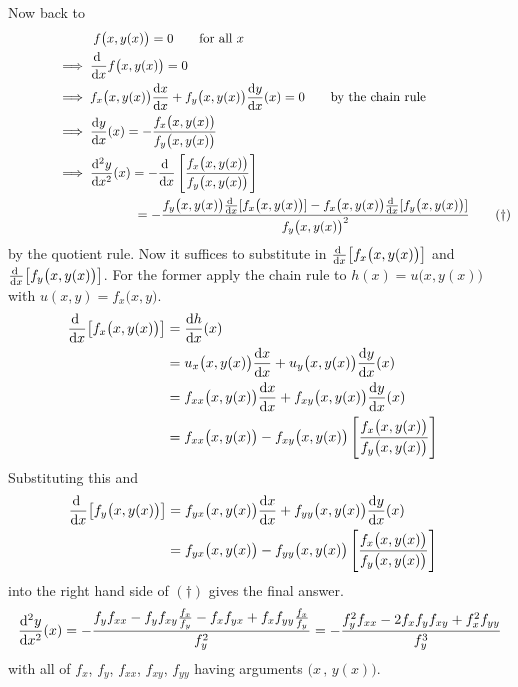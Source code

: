 \begin{eg}
Now back to 
\begin{align}
&\phantom{\implies a} f\big(x,y(x)\big) = 0\qquad\text{for all }x\notag\\
\hskip.5in&\implies \diff{}{x}f\big(x,y(x)\big) = 0\notag\\
&\implies f_x\big(x,y(x)\big)\diff{x}{x}
+f_y\big(x,y(x)\big)\diff{y}{x}(x) = 0\qquad\text{by the chain rule}\notag\\
&\implies 
\diff{y}{x}(x) = -\frac{f_x\big(x,y(x)\big)}{f_y\big(x,y(x)\big)}\notag\\
&\implies 
\difftwo{y }{x}(x) = -\diff{}{x}\left[\frac{f_x\big(x,y(x)\big)}{f_y\big(x,y(x)\big)}\right]\notag\\
&\phantom{\implies a \difftwo{y }{x}(x)}= -\frac{f_y\big(x,y(x)\big)\diff{}{x}[f_x\big(x,y(x)\big)]
-f_x\big(x,y(x)\big)\diff{}{x}[f_y\big(x,y(x)\big)]}
{f_y\big(x,y(x)\big)^2}
\tag{$\dagger$}
\end{align}
by the quotient rule. Now it suffices to substitute in
 $\diff{}{x}\big[f_x\big(x,y(x)\big)\big]$ and 
$\diff{}{x}\big[f_y\big(x,y(x)\big)\big]$. For the former apply
the chain rule to $h(x) = u\big(x,y(x)\big)$ with $u(x,y)=f_x\big(x,y\big)$.
\begin{align*}
\diff{}{x}\big[f_x\big(x,y(x)\big)\big]&=\diff{h}{x}(x)\cr
&=u_x\big(x,y(x)\big)\diff{x}{x}
+u_y\big(x,y(x)\big)\diff{y}{x}(x)\cr
&=f_{xx}\big(x,y(x)\big)\diff{x}{x}
+f_{xy}\big(x,y(x)\big)\diff{y}{x}(x)\cr
&=f_{xx}\big(x,y(x)\big)
-f_{xy}\big(x,y(x)\big)
\left[\frac{f_x\big(x,y(x)\big)}{f_y\big(x,y(x)\big)}\right]
\end{align*}
Substituting this and 
\begin{align*}
\diff{}{x}\big[f_y\big(x,y(x)\big)\big]
&=f_{yx}\big(x,y(x)\big)\diff{x}{x}
+f_{yy}\big(x,y(x)\big)\diff{y}{x}(x)\cr
&=f_{yx}\big(x,y(x)\big)
-f_{yy}\big(x,y(x)\big)
\left[\frac{f_x\big(x,y(x)\big)}{f_y\big(x,y(x)\big)}\right]
\end{align*}
into the right hand side of $(\dagger)$ gives the final answer.
\begin{align*}
\difftwo{y}{x}(x) 
= -\frac{
                                 f_y f_{xx}
                             -  f_y f_{xy} \frac{f_x}{f_y}
                             - f_x f_{yx}
                             + f_x f_{yy}\frac{f_x}{f_y}}
                         {f_y^2}
= -\frac{
                                 f_y^2 f_{xx}
                             - 2 f_x f_y f_{xy}
                               + f_x^2 f_{yy}}
                         {f_y^3}
\end{align*}
with all of $f_x$, $f_y$, $f_{xx}$, $f_{xy}$, $f_{yy}$ having arguments
$\big(x\,,\,y(x)\big)$. 

\end{eg}

